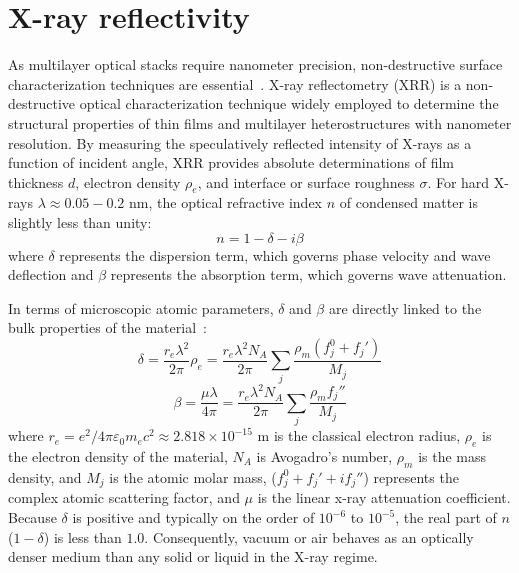 \section{X-ray reflectivity}\label{sec: xrr}
As multilayer optical stacks require nanometer precision, non-destructive surface characterization techniques are essential~\cite{parrattSurfaceStudiesSolids1954, pietschHighResolutionXRayScattering2004}. X-ray reflectometry (XRR) is a non-destructive optical characterization technique widely employed to determine the structural properties of thin films and multilayer heterostructures with nanometer resolution. By measuring the speculatively reflected intensity of X-rays as a function of incident angle, XRR provides absolute determinations of film thickness $d$, electron density $\rho_e$, and interface or surface roughness $\sigma$. 
For hard X-rays $\lambda \approx 0.05 - 0.2\text{ nm}$, the optical refractive index $n$ of condensed matter is slightly less than unity:
\begin{equation} \label{eqn: xrr_index}
	n = 1 - \delta - i\beta
\end{equation}
where $\delta$ represents the dispersion term, which governs phase velocity and wave deflection and $\beta$ represents the absorption term, which governs wave attenuation.

In terms of microscopic atomic parameters, $\delta$ and $\beta$ are directly linked to the bulk properties of the material~\cite{pietschHighResolutionXRayScattering2004}:
\begin{equation} \label{eqn: xrr_delta}
	\delta = \frac{r_e \lambda^2}{2\pi} \rho_e = \frac{r_e \lambda^2 N_A}{2\pi} \sum_j \frac{\rho_m (f_j^0 + f_j')}{M_j}
\end{equation}
\begin{equation} \label{eqn: xrr_beta}
	\beta = \frac{\mu \lambda}{4\pi} = \frac{r_e \lambda^2 N_A}{2\pi} \sum_j \frac{\rho_m f_j''}{M_j}
\end{equation}
where $r_e = {e^2}/{4\pi\varepsilon_0 m_e c^2} \approx 2.818 \times 10^{-15}\text{ m}$ is the classical electron radius, $\rho_e$ is the electron density of the material, $N_A$ is Avogadro's number, $\rho_m$ is the mass density, and $M_j$ is the atomic molar mass,  ($f_j^0 + f_j' + i f_j''$) represents the complex atomic scattering factor, and $\mu$ is the linear x-ray attenuation coefficient. Because $\delta$ is positive and typically on the order of $10^{-6}$ to $10^{-5}$, the real part of $n$ ($1 - \delta$) is less than $1.0$. Consequently, vacuum or air behaves as an optically denser medium than any solid or liquid in the X-ray regime.

